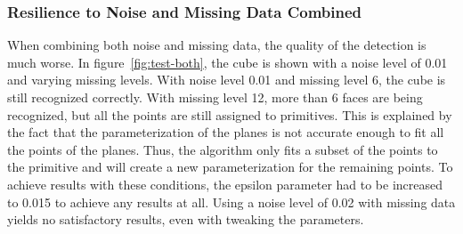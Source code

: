 \subsubsection{Resilience to Noise and Missing Data Combined}

When combining both noise and missing data, the quality of the detection is much worse.
In figure~\ref{fig:test-both}, the cube is shown with a noise level of 0.01 and varying missing levels.
With noise level 0.01 and missing level 6, the cube is still recognized correctly.
With missing level 12, more than 6 faces are being recognized, but all the points are still assigned to primitives.
This is explained by the fact that the parameterization of the planes is not accurate enough to fit all the points of the planes.
Thus, the algorithm only fits a subset of the points to the primitive and will create a new parameterization
for the remaining points.
To achieve results with these conditions, the epsilon parameter had to be increased to 0.015 to achieve any results at all.
Using a noise level of 0.02 with missing data yields no satisfactory results, even with tweaking the parameters.

